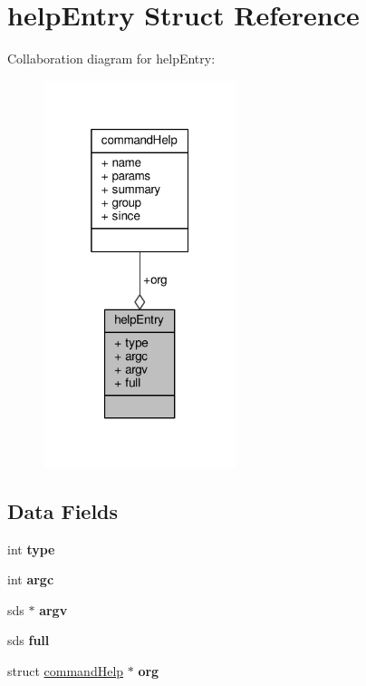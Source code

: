 \hypertarget{structhelpEntry}{}\section{help\+Entry Struct Reference}
\label{structhelpEntry}


Collaboration diagram for help\+Entry\+:\nopagebreak
\begin{figure}[H]
\begin{center}
\leavevmode
\includegraphics[width=160pt]{structhelpEntry__coll__graph}
\end{center}
\end{figure}
\subsection*{Data Fields}
\begin{DoxyCompactItemize}
\item 
\mbox{\label{structhelpEntry_a5ec4aaa14b4effb4d4141580541173ff}} 
int {\bfseries type}
\item 
\mbox{\label{structhelpEntry_ad62205ba643b74c6cd45ebaf9963e72c}} 
int {\bfseries argc}
\item 
\mbox{\label{structhelpEntry_acccc8bea30c611a6e5b20aece3961556}} 
sds $\ast$ {\bfseries argv}
\item 
\mbox{\label{structhelpEntry_aac5638903c052c507e9c138e8093ef68}} 
sds {\bfseries full}
\item 
\mbox{\label{structhelpEntry_a61f1bf14285f0030c4465cbda8338803}} 
struct \hyperlink{structcommandHelp}{command\+Help} $\ast$ {\bfseries org}
\end{DoxyCompactItemize}


